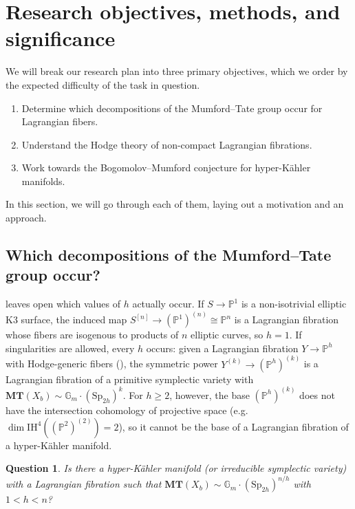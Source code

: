 \documentclass[11pt]{article}
\newcommand{\Gm}{\mathbb{G}_m}
\newcommand{\bbP}{\mathbb{P}}
\newcommand{\MT}{\mathbf{MT}}
\newcommand{\Sp}{\mathrm{Sp}}
\newcommand{\IH}{\mathrm{IH}}
\theoremstyle{compact}
\newtheorem{question}{Question}
\begin{document}
\section{Research objectives, methods, and significance}

We will break our research plan into three primary objectives, which we order by the
expected difficulty of the task in question.
\begin{enumerate}[label=\textbf{RO \arabic*.}]
  \item Determine which decompositions of the Mumford--Tate group occur for Lagrangian fibers.
  \item Understand the Hodge theory of non-compact Lagrangian fibrations.
  \item Work towards the Bogomolov--Mumford conjecture for hyper-K\"ahler manifolds.
\end{enumerate}

In this section, we will go through each of them, laying out a motivation and an 
approach.

\subsection{Which decompositions of the Mumford--Tate group occur?}

 leaves open which values of $h$ actually occur. If $S\to\bbP^1$ is a
non-isotrivial elliptic K3 surface, the induced map $S^{[n]}\to(\bbP^1)^{(n)}\cong\bbP^n$ is
a Lagrangian fibration whose fibers are isogenous to products of $n$ elliptic curves, so
$h=1$. If singularities are allowed, every $h$ occurs: given a Lagrangian fibration
$Y\to\bbP^h$ with Hodge-generic fibers (), the symmetric power
$Y^{(k)}\to(\bbP^h)^{(k)}$ is a Lagrangian fibration of a primitive symplectic variety with
$\MT(X_b)\sim\Gm\cdot(\Sp_{2h})^k$. For $h\ge2$, however, the base $(\bbP^h)^{(k)}$ does not
have the intersection cohomology of projective space (e.g.\
$\dim\IH^4((\bbP^2)^{(2)})=2$), so it cannot be the base of a Lagrangian fibration of a
hyper-K\"ahler manifold.

\begin{question}\label{q:classification}
Is there a hyper-K\"ahler manifold (or irreducible symplectic variety) with a Lagrangian
fibration such that $\MT(X_b)\sim\Gm\cdot(\Sp_{2h})^{n/h}$ with $1<h<n$?
\end{question}
\end{document}

